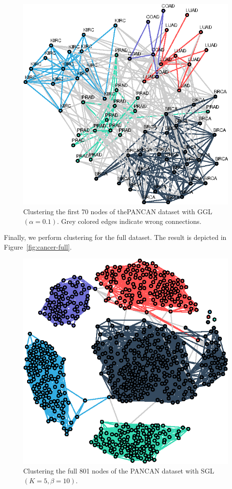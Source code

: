\begin{figure}[!htb]
  \centering
  \includegraphics[width=.475\textwidth]{cancer-rna/latex/figures/cancer-rna-graph-subset-ggl.eps}
  \caption{Clustering the first 70 nodes of the\textsf{PANCAN} dataset with \textsf{GGL}$(\alpha = 0.1)$.
            Grey colored edges indicate wrong connections.}
  \label{fig:cancer-gene-ggl}
\end{figure}

Finally, we perform clustering for the full dataset. The result is depicted in Figure~\ref{fig:cancer-full}.
\begin{figure}[!htb]
  \centering
  \includegraphics[width=.475\textwidth]{cancer-rna/latex/figures/cancer-rna-graph-full.eps}
  \caption{Clustering the full 801 nodes of the \textsf{PANCAN} dataset with \textsf{SGL}$(K = 5, \beta = 10)$.}
  \label{fig:cancer-gene-sgl}
\end{figure}

